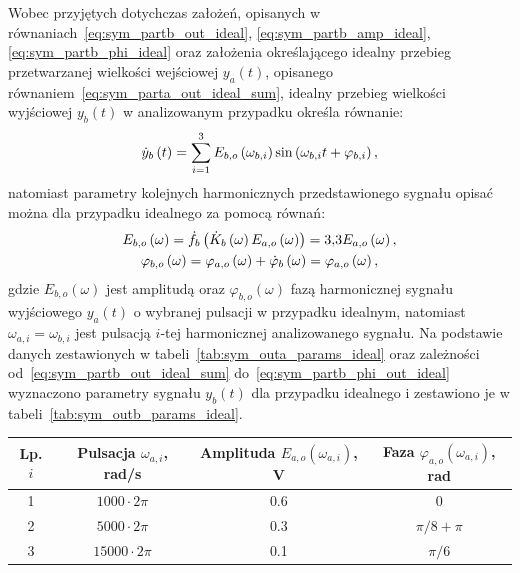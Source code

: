 Wobec przyjętych dotychczas założeń, opisanych w równaniach~\eqref{eq:sym_partb_out_ideal}, \eqref{eq:sym_partb_amp_ideal}, \eqref{eq:sym_partb_phi_ideal} oraz założenia określającego idealny przebieg przetwarzanej wielkości wejściowej $y_{a}(t)$, opisanego równaniem~\eqref{eq:sym_parta_out_ideal_sum}, idealny przebieg wielkości wyjściowej $y_{b}(t)$ w analizowanym przypadku określa równanie:
\begin{equation}
\dot{y}_{b} \left(t\right) = \sum _{i=1} ^{3} E_{b,o} \left(\omega_{b,i}\right) \sin \left(\omega_{b,i} t + \varphi_{b,i}\right) \label{eq:sym_partb_out_ideal_sum},
\end{equation}
natomiast parametry kolejnych harmonicznych przedstawionego sygnału opisać można dla przypadku idealnego za pomocą równań:
\begin{gather}
E_{b,o} \left(\omega\right) = \dot{f}_{b} \left(\dot{K}_{b} \left(\omega\right) E_{a,o} \left(\omega\right)\right) = \num{3.3} E_{a,o} \left(\omega\right) \label{eq:sym_partb_amp_out_ideal}, \\
\varphi_{b,o} \left(\omega\right) = \varphi_{a,o} \left(\omega\right) + \dot{\varphi}_{b} \left(\omega\right) = \varphi_{a,o} \left(\omega\right) \label{eq:sym_partb_phi_out_ideal},
\end{gather}
gdzie $E_{b,o}(\omega)$ jest amplitudą oraz $\varphi_{b,o}(\omega)$ fazą harmonicznej sygnału wyjściowego $y_{a}(t)$ o wybranej pulsacji w przypadku idealnym, natomiast $\omega_{a,i} = \omega_{b,i}$ jest pulsacją $i$-tej harmonicznej analizowanego sygnału. Na podstawie danych zestawionych w tabeli~\ref{tab:sym_outa_params_ideal} oraz zależności od~\eqref{eq:sym_partb_out_ideal_sum} do~\eqref{eq:sym_partb_phi_out_ideal} wyznaczono parametry sygnału $y_{b}(t)$ dla przypadku idealnego i zestawiono je w tabeli~\ref{tab:sym_outb_params_ideal}.

\begin{table}[htb!]
\begin{center}
\begin{tabular}[c]{| c | c | c | c |} \hline
\textbf{Lp. $i$} & \textbf{Pulsacja $\omega_{a,i}$, rad/s} & \textbf{Amplituda $E_{a,o}(\omega_{a,i})$, V} & \textbf{Faza $\varphi_{a,o}(\omega_{a,i})$, rad} \\ \hline
1 & $1000  \cdot 2\pi$ &  \num{0.6} & $0$           \\ \hline
2 & $5000  \cdot 2\pi$ &  \num{0.3} & $\pi/8 + \pi$ \\ \hline
3 & $15000 \cdot 2\pi$ &  \num{0.1} & $\pi/6$       \\ \hline
\end{tabular}
\end{center}
\end{table}

